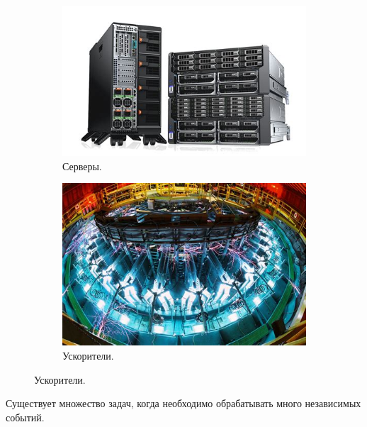 
\begin{frame}%
	\titlepage
\end{frame}

\begin{frame}	
	\begin{figure}[h!]
		\centering
		\begin{subfigure}[b]{0.4\linewidth}
			\includegraphics[width=\linewidth]{images/server.jpg}
			\caption{Серверы.}
		\end{subfigure}
		\hfill
		\begin{subfigure}[b]{0.4\linewidth}
			\includegraphics[width=\linewidth]{images/accelerator.jpg}
			\caption{Ускорители.}
		\end{subfigure}
	\end{figure}
	\par
	Существует множество задач, когда необходимо обрабатывать много независимых событий.
\end{frame}

